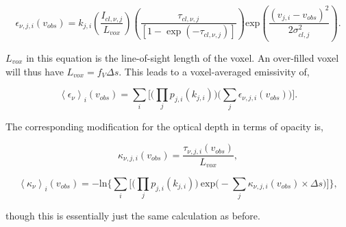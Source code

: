 \documentclass[a4paper]{article}
\begin{document}
    \begin{equation}
    \label{corrected emissivity}
    \epsilon_{\nu,j,i} (v_{obs}) = k_{j,i} \left( \frac{I_{cl,\nu,j}}{L_{vox}} \right) \left(\frac{\tau_{cl,\nu,j}}{\left[ 1 - \exp(- \tau_{cl,\nu,j}) \right]} \right) \mathrm{exp} \left( \frac{(v_{j,i}-v_{obs})^2}{2\sigma_{cl,j}^2} \right).
    \end{equation}

    \(L_{vox}\) in this equation is the line-of-sight length of the voxel. An over-filled voxel will thus have \(L_{vox} = f_V \Delta s\). This leads to a voxel-averaged emissivity of,

    \begin{equation}
    \label{corrected voxel-averaged emissivity}
    \left< \epsilon_\nu \right>_{i} (v_{obs}) = \sum_i \bigg[ \Big( \prod_j p_{j,i}(k_{j,i}) \Big) \Big( \sum_j \epsilon_{\nu,j,i} (v_{obs}) \Big) \bigg].
    \end{equation}

    The corresponding modification for the optical depth in terms of opacity is,

    \begin{equation}
    \label{corrected opacity}
    \kappa_{\nu,j,i} (v_{obs}) = \frac{\tau_{\nu,j,i} (v_{obs})}{L_{vox}},
    \end{equation}

    \begin{equation}
    \label{corrected voxel-averaged opacity}
    \left< \kappa_\nu \right>_{i} (v_{obs}) = -\mathrm{ln} \Bigg\{ \sum_i \bigg[ \Big( \prod_j p_{j,i}(k_{j,i}) \Big) \ \mathrm{exp} \Big( - \sum_j \kappa_{\nu,j,i} (v_{obs}) \times \Delta s \Big) \bigg] \Bigg\},
    \end{equation}

    though this is essentially just the same calculation as before.
\end{document}
